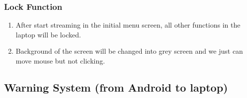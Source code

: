 \documentclass[12pt]{article}
\begin{document}
\subsubsection{Lock Function}
\begin{enumerate}
\item After start streaming in the initial menu screen, all other functions in the laptop will be locked.
\item Background of the screen will be changed into grey screen and we just can move mouse but not clicking.
\end{enumerate}


\subsection{Warning System (from Android to laptop)}
\end{document}
